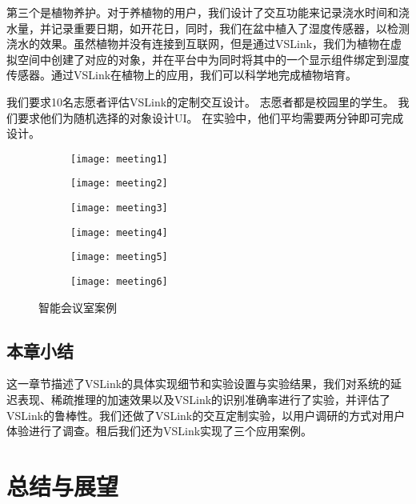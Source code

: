 第三个是植物养护。对于养植物的用户，我们设计了交互功能来记录浇水时间和浇水量，并记录重要日期，如开花日，同时，我们在盆中植入了湿度传感器，以检测浇水的效果。虽然植物并没有连接到互联网，但是通过VSLink，我们为植物在虚拟空间中创建了对应的对象，并在平台中为同时将其中的一个显示组件绑定到湿度传感器。通过VSLink在植物上的应用，我们可以科学地完成植物培育。

我们要求10名志愿者评估VSLink的定制交互设计。
志愿者都是校园里的学生。
我们要求他们为随机选择的对象设计UI。
在实验中，他们平均需要两分钟即可完成设计。



\begin{figure}[htbp]
	\centering
	\begin{subfigure}{.48\linewidth}
		\texttt{[image: meeting1]}
		\caption{}
	\end{subfigure}
	\quad
	\begin{subfigure}{.48\linewidth}
		\texttt{[image: meeting2]}
		\caption{}
	\end{subfigure}
	\quad
	\begin{subfigure}{.48\linewidth}
		\texttt{[image: meeting3]}
		\caption{}
	\end{subfigure}
	\quad
	\begin{subfigure}{.48\linewidth}
		\texttt{[image: meeting4]}
		\caption{}
	\end{subfigure}
	\quad
	\begin{subfigure}{.48\linewidth}
		\texttt{[image: meeting5]}
		\caption{}
	\end{subfigure}
	\quad
	\begin{subfigure}{.48\linewidth}
		\texttt{[image: meeting6]}
		\caption{}
	\end{subfigure}
	\caption{智能会议室案例}\label{fig:meeting}
\end{figure}

\section{本章小结}
这一章节描述了VSLink的具体实现细节和实验设置与实验结果，我们对系统的延迟表现、稀疏推理的加速效果以及VSLink的识别准确率进行了实验，并评估了VSLink的鲁棒性。我们还做了VSLink的交互定制实验，以用户调研的方式对用户体验进行了调查。租后我们还为VSLink实现了三个应用案例。

\chapter{总结与展望}
\label{chap:sum}

